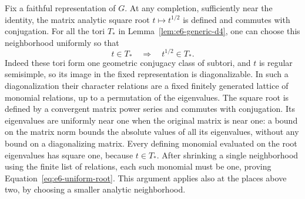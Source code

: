 Fix a faithful representation of $G$.  At any completion, sufficiently
near the identity, the matrix analytic square root $t\mapsto t^{1/2}$
is defined and commutes with conjugation.  For all the tori $T_*$ in
Lemma~\ref{lem:e6-generic-d4}, one can choose this neighborhood uniformly
so that
\begin{equation}\label{eq:e6-uniform-root}
                  t\in T_*\quad\Longrightarrow\quad t^{1/2}\in T_*.
\end{equation}
Indeed these tori form one geometric conjugacy class of subtori, and
$t$ is regular semisimple, so its image in the fixed representation is
diagonalizable.  In such a diagonalization their character relations
are a fixed finitely generated lattice of monomial relations, up to a
permutation of the eigenvalues.  The square root is defined by a
convergent matrix power series and commutes with conjugation.  Its
eigenvalues are uniformly near one when the original matrix is near
one: a bound on the matrix norm bounds the absolute values of all its
eigenvalues, without any bound on a diagonalizing matrix.  Every
defining monomial evaluated on the root eigenvalues has square one,
because $t\in T_*$.  After shrinking a single neighborhood using the
finite list of relations, each such monomial must be one, proving
Equation~\eqref{eq:e6-uniform-root}.  This argument applies also at the
places above two, by choosing a smaller analytic neighborhood.


